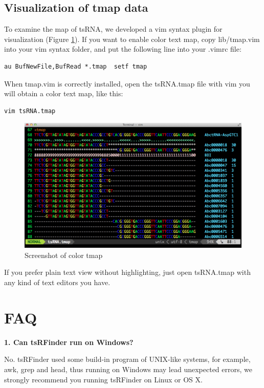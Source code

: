 \documentclass[11pt, a4paper]{article}
\begin{document}
\subsection{Visualization of tmap data}

To examine the map of tsRNA, we developed a vim syntax plugin for visualization (Figure \ref{tmap}). If you want to enable color text map, copy lib/tmap.vim into your vim syntax folder, and put the following line into your .vimrc file:

\begin{verbatim}
au BufNewFile,BufRead *.tmap  setf tmap
\end{verbatim}

When tmap.vim is correctly installed, open the tsRNA.tmap file with vim you will obtain a color text map, like this:

\begin{verbatim}
vim tsRNA.tmap
\end{verbatim}

\begin{figure}[htbp]
\begin{center}
\includegraphics[width=12cm]{tmap.png}
\caption{Screenshot of color tmap} 
\label{tmap}
\end{center}
\end{figure}

If you prefer plain text view without highlighting, just open tsRNA.tmap with any kind of text editors you have.

\section{FAQ}

\textbf{1. Can tsRFinder run on Windows?}

No. tsRFinder used some build-in program of UNIX-like systems, for example, awk, grep and head, thus running on Windows may lead unexpected errors, we strongly recommend you running tsRFinder on Linux or OS X.
\end{document}
